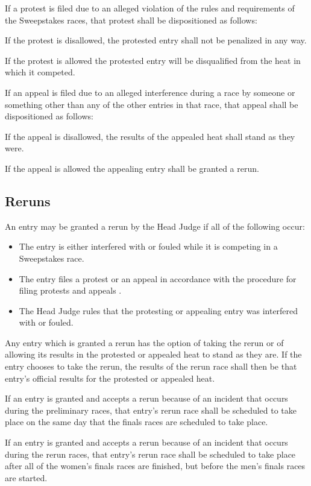 If a protest is filed due to an alleged violation of the rules and requirements of the Sweepstakes races, that protest shall be dispositioned as follows:

If the protest is disallowed, the protested entry shall not be penalized in any way.

If the protest is allowed the protested entry will be disqualified from the heat in which it competed.

If an appeal is filed due to an alleged interference during a race by someone or something other than any of the other entries in that race, that appeal shall be dispositioned as follows:

If the appeal is disallowed, the results of the appealed heat shall stand as they were.

If the appeal is allowed the appealing entry shall be granted a rerun.

\subsection{Reruns}

An entry may be granted a rerun by the Head Judge if all of the following occur:
	\begin{itemize}
		\item The entry is either interfered with or fouled while it is competing in a Sweepstakes race.
		\item The entry files a protest or an appeal in accordance with the procedure for filing protests and appeals .
		\item The Head Judge rules that the protesting or appealing entry was interfered with or fouled.
	\end{itemize}

Any entry which is granted a rerun has the option of taking the rerun or of allowing its results in the protested or appealed heat to stand as they are. If the entry chooses to take the rerun, the results of the rerun race shall then be that entry's official results for the protested or appealed heat.

If an entry is granted and accepts a rerun because of an incident that occurs during the preliminary races, that entry's rerun race shall be scheduled to take place on the same day that the finals races are scheduled to take place.

If an entry is granted and accepts a rerun because of an incident that occurs during the rerun races, that entry's rerun race shall be scheduled to take place after all of the women's finals races are finished, but before the men's finals races are started.

